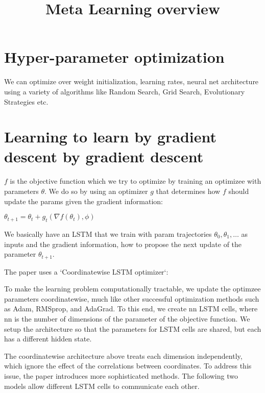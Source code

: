 \documentclass{article}
\begin{document}
\title{Meta Learning overview}
\maketitle
\tableofcontents

\section{Hyper-parameter optimization}

We can optimize over weight initialization, learning rates, neural net architecture using a variety of algorithms like Random Search, Grid Search, Evolutionary Strategies etc.


\section{Learning to learn by gradient descent by gradient descent}

$f$ is the objective function which we try to optimize by training an optimizee with parameters $\theta$. We do so by using an optimizer $g$ that determines how $f$ should update the params given the gradient information:

$\theta_{t+1} = \theta_{t} + g_{t}(\nabla f(\theta_{t}), \phi)$

We basically have an LSTM that we train with param trajectories $\theta_{0}, \theta_{1}, \ldots$ as inputs and the gradient information, how to propose the next update of the parameter $\theta_{t+1}$.

The paper uses a `Coordinatewise LSTM optimizer`:


To make the learning problem computationally tractable, we update the optimzee parameters coordinatewise, much like other successful optimization methods such as Adam, RMSprop, and AdaGrad.
To this end, we create nn LSTM cells, where nn is the number of dimensions of the parameter of the objective function. We setup the architecture so that the parameters for LSTM cells are shared, but each has a different hidden state.

The coordinatewise architecture above treats each dimension independently, which ignore the effect of the correlations between coordinates. To address this issue, the paper introduces more sophisticated methods. The following two models allow different LSTM cells to communicate each other.
\end{document}
